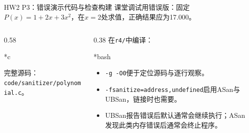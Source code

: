 \begin{frame}{HW2 P3：错误演示代码与检查构建}
    \small 课堂调试用错误版：固定$P(x)=1+2x+3x^2$，在$x=2$处求值，正确结果应为\alert{17.000}。
    \begin{columns}[T]
        \begin{column}{0.58\textwidth}
            \begin{Code}*{c}
                
            \end{Code}
            \scriptsize 完整源码：\texttt{code/sanitizer/polynomial.c}。
        \end{column}
        \begin{column}{0.38\textwidth}
            \small 在\texttt{r4/}中编译：
            \begin{Code}*{bash}
                
            \end{Code}
            \scriptsize
            \begin{itemize}
                \item \texttt{-g -O0}便于定位源码与逐行观察。
                \item \texttt{-fsanitize=address,undefined}启用ASan与UBSan，链接时也需要。
                \item UBSan报告错误后默认通常会继续执行；ASan发现此类内存错误后通常会终止程序。
            \end{itemize}
        \end{column}
    \end{columns}
\end{frame}

